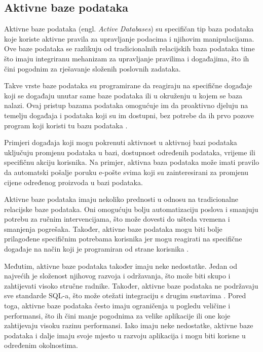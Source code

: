 \documentclass[]{foi}
\begin{document}
\subsection{Aktivne baze podataka}

Aktivne baze podataka (engl. \textit{Active Databases}) \cite{tbp} su specifičan tip baza podataka koje koriste aktivne pravila za upravljanje podacima i njihovim manipulacijama. Ove baze podataka se razlikuju od tradicionalnih relacijskih baza podataka time što imaju integriranu mehanizam za upravljanje pravilima i događajima, što ih čini pogodnim za rješavanje složenih poslovnih zadataka.

Takve vrste baze podataka su programirane da reagiraju na specifične događaje koji se događaju unutar same baze podataka ili u okruženju u kojem se baza nalazi. Ovaj pristup bazama podataka omogućuje im da proaktivno djeluju na temelju događaja i podataka koji su im dostupni, bez potrebe da ih prvo pozove program koji koristi tu bazu podataka \cite{tbp}.

Primjeri događaja koji mogu pokrenuti aktivnost u aktivnoj bazi podataka uključuju promjenu podataka u bazi, dostupnost određenih podataka, vrijeme ili specifičnu akciju korisnika. Na primjer, aktivna baza podataka može imati pravilo da automatski pošalje poruku e-pošte svima koji su zainteresirani za promjenu cijene određenog proizvoda u bazi podataka.

Aktivne baze podataka imaju nekoliko prednosti u odnosu na tradicionalne relacijske baze podataka. Oni omogućuju bolju automatizaciju poslova i smanjuju potrebu za ručnim intervencijama, što može dovesti do ušteda vremena i smanjenja pogrešaka. Također, aktivne baze podataka mogu biti bolje prilagođene specifičnim potrebama korisnika jer mogu reagirati na specifične događaje na način koji je programiran od strane korisnika \cite{tbp}.

Međutim, aktivne baze podataka također imaju neke nedostatke. Jedan od najvećih je složenost njihovog razvoja i održavanja, što može biti skupo i zahtijevati visoko stručne radnike. Također, aktivne baze podataka ne podržavaju sve standarde SQL-a, što može otežati integraciju s drugim sustavima \cite{tbp}. Pored toga, aktivne baze podataka često imaju ograničenja u pogledu veličine i performansi, što ih čini manje pogodnima za velike aplikacije ili one koje zahtijevaju visoku razinu performansi. Iako imaju neke nedostatke, aktivne baze podataka i dalje imaju svoje mjesto u razvoju aplikacija i mogu biti korisne u određenim okolnostima.
\newpage
\end{document}
